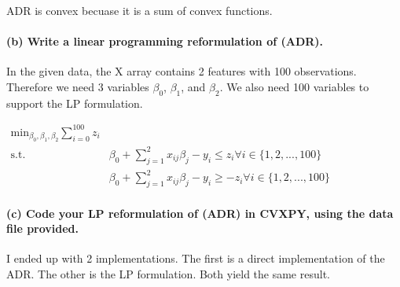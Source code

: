 \documentclass[11pt]{article}
\begin{document}
ADR is convex becuase it is a sum of convex functions.

\hypertarget{b-write-a-linear-programming-reformulation-of-adr.}{%
\paragraph{(b) Write a linear programming reformulation of
(ADR).}\label{b-write-a-linear-programming-reformulation-of-adr.}}

In the given data, the X array contains 2 features with 100
observations. Therefore we need 3 variables \(\beta_0\), \(\beta_1\),
and \(\beta_2\). We also need 100 variables to support the LP
formulation.

\(\begin{aligned} \text{min}_{\beta_0, \beta_1, \beta_2} \sum_{i=0}^{100} z_i \\ \text{s.t.} & \beta_0 + \sum_{j=1}^2 x_{ij}\beta_j - y_i \le z_i \forall i \in \{1,2,...,100\} \\ & \beta_0 + \sum_{j=1}^2 x_{ij}\beta_j - y_i \ge -z_i \forall i \in \{1,2,...,100\} \end{aligned}\)

\hypertarget{c-code-your-lp-reformulation-of-adr-in-cvxpy-using-the-data-file-provided.}{%
\paragraph{(c) Code your LP reformulation of (ADR) in CVXPY, using the
data file
provided.}\label{c-code-your-lp-reformulation-of-adr-in-cvxpy-using-the-data-file-provided.}}

I ended up with 2 implementations. The first is a direct implementation
of the ADR. The other is the LP formulation. Both yield the same result.
\end{document}
